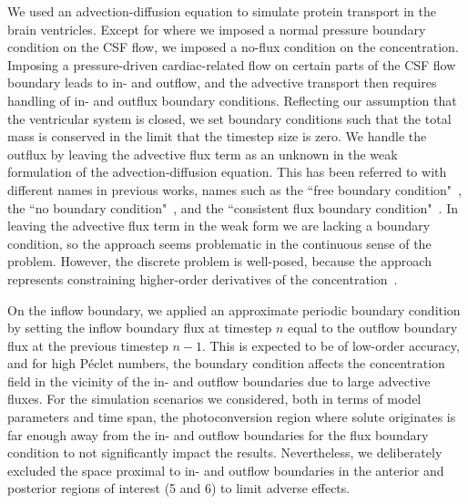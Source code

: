 \documentclass[fleqn]{wlscirep}
\begin{document}
We used an advection-diffusion equation to simulate protein transport in the brain ventricles. Except for where we imposed a normal pressure boundary condition on the CSF flow, we imposed a no-flux condition on the concentration. Imposing a pressure-driven cardiac-related flow on certain parts of the CSF flow boundary leads to in- and outflow, and the advective transport then requires handling of in- and outflux boundary conditions. Reflecting our assumption that the ventricular system is closed, we set boundary conditions such that the total mass is conserved in the limit that the timestep size is zero. We handle the outflux by leaving the advective flux term as an unknown in the weak formulation of the advection-diffusion equation. This has been referred to with different names in previous works, names such as the ``free boundary condition"~\cite{Papanastasiou1992ACondition}, the ``no boundary condition"~\cite{Griffiths1997TheCondition}, and the ``consistent flux boundary condition"~\cite{Lynch2020NumericalHemodynamics}. In leaving the advective flux term in the weak form we are lacking a boundary condition, so the approach seems problematic in the continuous sense of the problem. However, the discrete problem is well-posed, because the approach represents constraining higher-order derivatives of the concentration~\cite{Griffiths1997TheCondition}. 

On the inflow boundary, we applied an approximate periodic boundary condition by setting the inflow boundary flux at timestep $n$ equal to the outflow boundary flux at the previous timestep $n-1$. This is expected to be of low-order accuracy, and for high Péclet numbers, the boundary condition affects the concentration field in the vicinity of the in- and outflow boundaries due to large advective fluxes. For the simulation scenarios we considered, both in terms of model parameters and time span, the photoconversion region where solute originates is far enough away from the in- and outflow boundaries for the flux boundary condition to not significantly impact the results. Nevertheless, we deliberately excluded the space proximal to in- and outflow boundaries in the anterior and posterior regions of interest (5 and 6) to limit adverse effects. 
\end{document}
